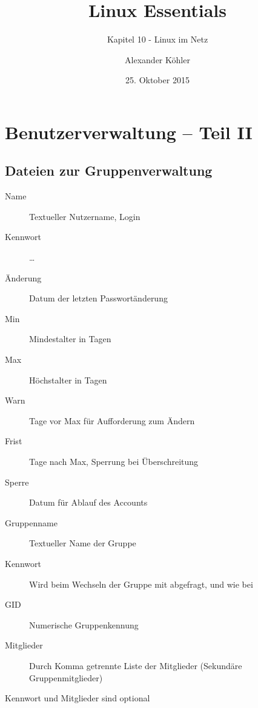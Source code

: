 \documentclass[aspectratio=43]{beamer}
\title[Linux Essentials  - Kapitel 10 - Linux im Netz]{Linux Essentials}
\subtitle{Kapitel 10 - Linux im Netz}
\author{Alexander Köhler}
\date{25. Oktober 2015}
\begin{document}
\logoframe

\frame{\titlepage}



\setcounter{tocdepth}{1}
\section[Gliederung]{}
\frame{\tableofcontents}


\section{Benutzerverwaltung -- Teil II}
\subsection{Dateien zur Gruppenverwaltung}
\begin{frame}{}
  \begin{center}
    \colorbox{yellow}{}
  \end{center}
  \begin{block}{}
    \begin{description}
      \item[Name]        Textueller Nutzername, Login
      \item[Kennwort]    \dots
      \item[Änderung]    Datum der letzten Passwortänderung
      \item[Min]         Mindestalter in Tagen
      \item[Max]         Höchstalter in Tagen
      \item[Warn]        Tage vor Max für Aufforderung zum Ändern 
      \item[Frist]       Tage nach Max, Sperrung bei Überschreitung
      \item[Sperre]      Datum für Ablauf des Accounts
    \end{description}
  \end{block}
\end{frame}
\begin{frame}{}
  \begin{center}
    \colorbox{yellow}{}
  \end{center}
  \begin{block}{}
    \begin{description}
      \item[Gruppenname] Textueller Name der Gruppe
      \item[Kennwort]    Wird beim Wechseln der Gruppe mit  abgefragt, \co{*} und  wie bei  
      \item[GID]         Numerische Gruppenkennung
      \item[Mitglieder]  Durch Komma getrennte Liste der Mitglieder (Sekundäre Gruppenmitglieder)
    \end{description}
  \end{block}
    Kennwort und Mitglieder sind optional
\end{frame}
\end{document}
